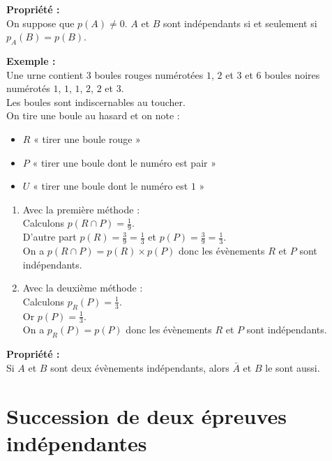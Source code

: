 \documentclass{article}
\begin{document}
\begin{mdframed}[style=proprieteStyle]
	\textbf{Propriété :} ~\\
	On suppose que $p(A)\not=0$. $A$ et $B$ sont indépendants si et seulement si $p_A(B)=p(B)$.
\end{mdframed}

\textbf{Exemple :} ~\\
Une urne contient $3$ boules rouges numérotées $1$, $2$ et $3$ et $6$ boules noires numérotés $1$, $1$, $1$, $2$, $2$ et $3$. \\
Les boules sont indiscernables au toucher. \\

On tire une boule au hasard et on note :
\vspace{-6pt}
\begin{itemize}
	\item $R$ « tirer une boule rouge »
	\item $P$ « tirer une boule dont le numéro est pair »
	\item $U$ « tirer une boule dont le numéro est $1$ »
\end{itemize}

\begin{enumerate}
	\item Avec la première méthode : \\
	      Calculons $p(R\cap P)=\frac{1}{9}$.\\
	      D'autre part $p(R)=\frac{3}{9}=\frac{1}{3}$ et $p(P)=\frac{3}{9}=\frac{1}{3}$. \\
	      On a $p(R\cap P)=p(R)\times p(P)$ donc les évènements $R$ et $P$ sont indépendants.
	\item Avec la deuxième méthode : \\
	      Calculons $p_R(P)=\frac{1}{3}$.\\
	      Or $p(P)=\frac{1}{3}$. \\
	      On a $p_R(P)=p(P)$ donc les évènements $R$ et $P$ sont indépendants.
\end{enumerate}

\begin{mdframed}[style=proprieteStyle]
	\textbf{Propriété :} ~\\
	Si $A$ et $B$ sont deux évènements indépendants, alors $\bar A$ et $B$ le sont aussi.
\end{mdframed}

\section{Succession de deux épreuves indépendantes}
\end{document}
